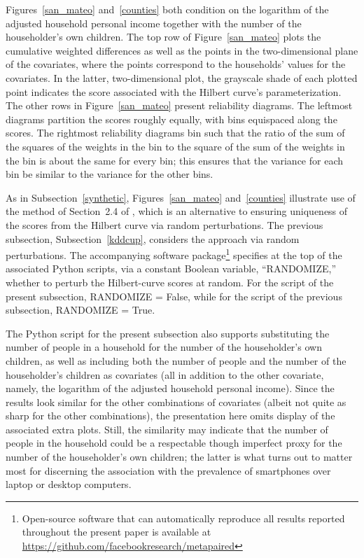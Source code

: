 \documentclass[]{fairmeta}
\begin{document}
Figures~\ref{san_mateo} and~\ref{counties} both condition on the logarithm
of the adjusted household personal income together with the number
of the householder's own children.
The top row of Figure~\ref{san_mateo} plots the cumulative weighted differences
as well as the points in the two-dimensional plane of the covariates,
where the points correspond to the households' values for the covariates.
In the latter, two-dimensional plot, the grayscale shade of each plotted point
indicates the score associated with the Hilbert curve's parameterization.
The other rows in Figure~\ref{san_mateo} present reliability diagrams.
The leftmost diagrams partition the scores roughly equally,
with bins equispaced along the scores.
The rightmost reliability diagrams bin such that the ratio
of the sum of the squares of the weights in the bin
to the square of the sum of the weights in the bin
is about the same for every bin; this ensures that the variance for each bin
be similar to the variance for the other bins.

As in Subsection~\ref{synthetic}, Figures~\ref{san_mateo} and~\ref{counties}
illustrate use of the method of Section~2.4 of \cite{tygert_pvals}, which is
an alternative to ensuring uniqueness of the scores from the Hilbert curve
via random perturbations. The previous subsection, Subsection~\ref{kddcup},
considers the approach via random perturbations. The accompanying software
package\footnote{Open-source software that can automatically reproduce
all results reported throughout the present paper is available at
\url{https://github.com/facebookresearch/metapaired}} specifies at the top
of the associated Python scripts, via a constant Boolean variable,
``RANDOMIZE,'' whether to perturb the Hilbert-curve scores at random.
For the script of the present subsection, RANDOMIZE = False,
while for the script of the previous subsection, RANDOMIZE = True.

The Python script for the present subsection also supports substituting
the number of people in a household for the number of the householder's
own children, as well as including both the number of people and the number
of the householder's children as covariates (all in addition to the other
covariate, namely, the logarithm of the adjusted household personal income).
Since the results look similar for the other combinations of covariates
(albeit not quite as sharp for the other combinations),
the presentation here omits display of the associated extra plots.
Still, the similarity may indicate that the number of people
in the household could be a respectable though imperfect proxy
for the number of the householder's own children;
the latter is what turns out to matter most for discerning the association
with the prevalence of smartphones over laptop or desktop computers.
\end{document}
